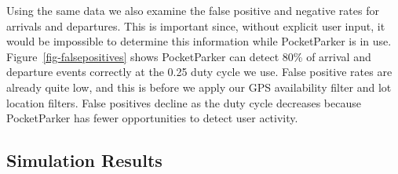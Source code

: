 Using the same data we also examine the false positive and negative rates for
arrivals and departures. This is important since, without explicit user
input, it would be impossible to determine this information while
PocketParker is in use. Figure~\ref{fig-falsepositives} shows PocketParker
can detect 80\% of arrival and departure events correctly at the 0.25 duty
cycle we use. False positive rates are already quite low, and this is before
we apply our GPS availability filter and lot location filters. False
positives decline as the duty cycle decreases because PocketParker has fewer
opportunities to detect user activity.

\subsection{Simulation Results}

